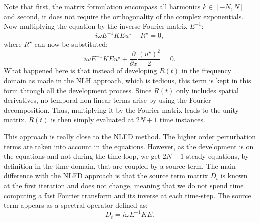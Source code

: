 Note that first, the matrix formulation encompass all harmonics
$k \in [-N, N]$ and second, it does not require the
orthogonality of the complex exponentials.
Now multiplying the equation by the inverse Fourier matrix $E^{-1}$:
\begin{equation}
	i \omega E^{-1} K E u^\star + R^\star = 0,
	\label{eq:sm_hb_matrix_form_mono}
\end{equation}
where $R^\star$ can now be substituted:
\begin{equation}
		i \omega E^{-1} K E u^\star + 
		\displaystyle \frac{\partial}{\partial x}
		\frac{(u^\star)^2}{2} = 0.
\end{equation}
What happened here is that instead of developing $R(t)$
in the frequency domain as made in the NLH approach,
which is tedious, this term is kept
in this form through all the development process. 
Since $R(t)$ only includes spatial derivatives, no temporal non-linear
terms
arise by using the Fourier decomposition. Thus, multiplying it
by the Fourier matrix leads to the unity matrix. 
$R(t)$ is then simply evaluated at $2N+1$ time instances.

This approach is really close to the NLFD method.
The higher order perturbation terms are taken into account
in the equations.
However,
as the development is on the equations and not during the time loop,
we get $2N+1$ steady equations, by definition in the time
domain, that are coupled by a source term.
The main difference with the NLFD approach
is that the source term matrix $D_t$ is known at the first iteration and does
not change, meaning that we do not spend time computing a
fast Fourier transform and its inverse at each time-step.
The source term appears as a spectral operator defined as:
\begin{equation}
	D_t = i \omega E^{-1} K E.
	\label{eq:sm_hb_mono_source_term_matrix}
\end{equation}

